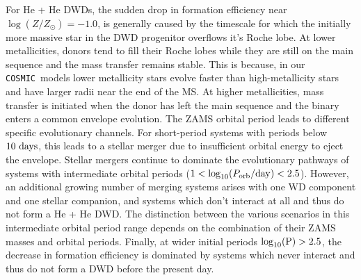 \documentclass[twocolumn]{aastex631}
\newcommand{\cosmic}{\texttt{COSMIC}}
\begin{document}


For He + He DWDs, the sudden drop in formation efficiency near $\log(Z/Z_{\odot})=-1.0$, is generally caused by the timescale for which the initially more massive star in the DWD progenitor overflows it's Roche lobe. At lower metallicities, donors tend to fill their Roche lobes while they are still on the main sequence and the mass transfer remains stable. This is because, in our \cosmic\ models %
lower metallicity stars evolve faster than high-metallicity stars and have larger radii near the end of the MS. At higher metallicities, mass transfer is initiated when the donor has left the main sequence and the binary enters a common envelope evolution. The ZAMS orbital period leads to different specific evolutionary channels. For short-period systems with periods below $10~\rm{days}$, this leads to a stellar merger due to insufficient orbital energy to eject the envelope. Stellar mergers continue to dominate the evolutionary pathways of systems with intermediate orbital periods ($1 < \log_{10}(P_{\rm{orb}}/\rm{day}) < 2.5$). However, an additional growing number of merging systems arises with one WD component and one stellar companion, and systems which don't interact at all and thus do not form a He + He DWD. The distinction between the various scenarios in this intermediate orbital period range depends on the combination of their ZAMS masses and orbital periods. Finally, at wider initial periods $\log_{10}(\rm{P}) > 2.5$, the decrease in formation efficiency is dominated by systems which never interact and thus do not form a DWD before the present day.
\end{document}
